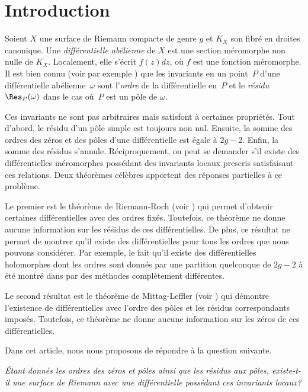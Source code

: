 \Changel

\section{Introduction}

Soient $X$ une surface de Riemann compacte de genre $g$ et $K_{X}$ son fibré en droites canonique. Une \emph{différentielle abélienne} de $X$ est une section méromorphe non nulle de $K_{X}$. Localement, elle s'écrit $f(z)dz$, où $f$ est une fonction méromorphe.
Il est bien connu (voir par exemple \cite[Encadré\,III.2]{dSG}) que les invariants en un point~$P$ d'une différentielle abélienne~$\omega$ sont l'\emph{ordre} de la différentielle en~$P$ et le \emph{résidu $\Res_{P}(\omega)$} dans le cas où~$P$ est un pôle de $\omega$.

Ces invariants ne sont pas arbitraires mais satisfont à certaines propriétés. Tout d'abord, le résidu d'un pôle simple est toujours non nul. Ensuite, la somme des ordres des zéros et des pôles d'une différentielle est égale à $2g-2$. Enfin, la somme des résidus s'annule. Réciproquement, on peut se demander s'il existe des différentielles méromorphes possédant des invariants locaux prescris satisfaisant ces relations.
Deux théorèmes célèbres apportent des réponses partielles à ce problème.
\par
Le premier est le théorème de Riemann-Roch (voir \cite[Th.\,9.3]{reyssat}) qui permet d'obtenir certaines différentielles avec des ordres fixés. Toutefois, ce théorème ne donne aucune information sur les résidus de ces différentielles. De plus, ce résultat ne permet de montrer qu'il existe des différentielles pour tous les ordres que nous pouvons considérer. Par exemple, le fait qu'il existe des différentielles holomorphes dont les ordres sont donnés par une partition quelconque de $2g-2$ à été montré dans \cite{masm} par des méthodes complètement différentes.
\par
Le second résultat est le théorème de Mittag-Leffler (voir \cite[Prop.\,9.3]{reyssat}) qui démontre l'existence de différentielles avec l'ordre des pôles et les résidus correspondants imposés. Toutefois, ce théorème ne donne aucune information sur les zéros de ces différentielles.

Dans cet article, nous nous proposons de répondre à la question suivante.
\par\smallskip
\emph{Étant donnés les ordres des zéros et pôles ainsi que les résidus aux pôles, existe-t-il une surface de Riemann avec une différentielle possédant ces invariants locaux?}

